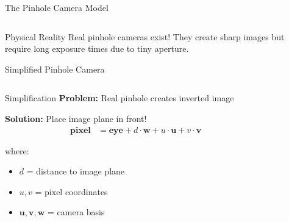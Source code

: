 \begin{frame}{The Pinhole Camera Model}
\begin{columns}
\begin{column}{0.5\textwidth}
        \end{column}
    \end{columns}
    
    \begin{conceptbox}{Physical Reality}
        Real pinhole cameras exist! They create sharp images but require long exposure times due to tiny aperture.
    \end{conceptbox}
\end{frame}

\begin{frame}{Simplified Pinhole Camera}
    \begin{columns}
        \begin{column}{0.5\textwidth}
            \begin{mathbox}{Simplification}
                \textbf{Problem:} Real pinhole creates inverted image
                
                \textbf{Solution:} Place image plane in front!
                \begin{align}
                    \mathbf{pixel} &= \mathbf{eye} + d \cdot \mathbf{w} + u \cdot \mathbf{u} + v \cdot \mathbf{v}
                \end{align}
                
                where:
                \begin{itemize}
                    \item $d$ = distance to image plane
                    \item $u, v$ = pixel coordinates
                    \item $\mathbf{u}, \mathbf{v}, \mathbf{w}$ = camera basis
                \end{itemize}
            \end{mathbox}
        \end{column}
        \begin{column}{0.5\textwidth}
\end{column}
\end{columns}
\end{frame}
